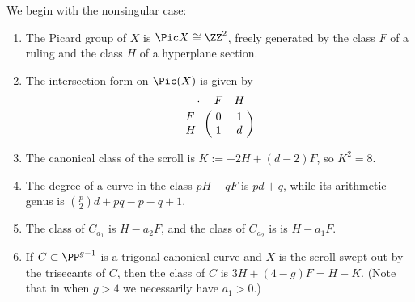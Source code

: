  We begin with the nonsingular case:

\begin{theorem}\label{pic of scroll}
\begin{enumerate} Suppose that $0<a_{1}$.

\item The Picard group of $X$ is $\Pic X \cong \ZZ^2$, freely generated by  the class $F$ of a ruling and the class $H$ of a  hyperplane section. 
\item The
intersection form on $\Pic(X)$ is given by
$$
\bordermatrix{\kern 10pt\cdot&F&H\cr
F&0&1\cr
H&1&d
}
$$

\item The canonical class of the scroll is $K := -2H +(d-2)F$, so $K^2 = 8$.

\item The degree of a curve in the class $pH+qF$ is $pd+q$, while its arithmetic genus is
${p\choose 2}d+pq-p-q+1$.

\item The class of $C_{a_1}$
is $H-a_2F$, and the class of $C_{a_2}$ is 
is $H-a_1F$. 
\item If $C \subset \PP^{g-1}$ is a trigonal canonical curve and $X$ is the scroll swept out by the trisecants of $C$, then the class of $C$ is $3H+(4-g)F = H-K$. (Note that in when $g>4$ we necessarily have $a_1 > 0$.)
\end{enumerate}
\end{theorem}

